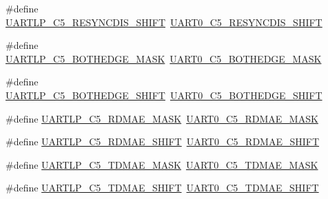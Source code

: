 \begin{DoxyCompactItemize}
\item 
\#define \hyperlink{group___backward___compatibility___symbols_gaff26147c2d7f8a45ddaa3d4ecb42343d}{U\+A\+R\+T\+L\+P\+\_\+\+C5\+\_\+\+R\+E\+S\+Y\+N\+C\+D\+I\+S\+\_\+\+S\+H\+I\+FT}~\hyperlink{group___u_a_r_t0___register___masks_gaf769ed12082fb9c441d47f5cdf1117e0}{U\+A\+R\+T0\+\_\+\+C5\+\_\+\+R\+E\+S\+Y\+N\+C\+D\+I\+S\+\_\+\+S\+H\+I\+FT}
\item 
\#define \hyperlink{group___backward___compatibility___symbols_ga6b248448b3fc7bf345c7a75bec3b8aa3}{U\+A\+R\+T\+L\+P\+\_\+\+C5\+\_\+\+B\+O\+T\+H\+E\+D\+G\+E\+\_\+\+M\+A\+SK}~\hyperlink{group___u_a_r_t0___register___masks_gaa34159b3052095ce96fa50cc6183de77}{U\+A\+R\+T0\+\_\+\+C5\+\_\+\+B\+O\+T\+H\+E\+D\+G\+E\+\_\+\+M\+A\+SK}
\item 
\#define \hyperlink{group___backward___compatibility___symbols_gac6b4dfae8e6dc532807323db5e2e489c}{U\+A\+R\+T\+L\+P\+\_\+\+C5\+\_\+\+B\+O\+T\+H\+E\+D\+G\+E\+\_\+\+S\+H\+I\+FT}~\hyperlink{group___u_a_r_t0___register___masks_ga7d1df71b9671df4f50ecb6c1e1518731}{U\+A\+R\+T0\+\_\+\+C5\+\_\+\+B\+O\+T\+H\+E\+D\+G\+E\+\_\+\+S\+H\+I\+FT}
\item 
\#define \hyperlink{group___backward___compatibility___symbols_ga8b81dfd26f766f55a3c80110e5439652}{U\+A\+R\+T\+L\+P\+\_\+\+C5\+\_\+\+R\+D\+M\+A\+E\+\_\+\+M\+A\+SK}~\hyperlink{group___u_a_r_t0___register___masks_ga75704957ea817d0ea4ef69975008dae1}{U\+A\+R\+T0\+\_\+\+C5\+\_\+\+R\+D\+M\+A\+E\+\_\+\+M\+A\+SK}
\item 
\#define \hyperlink{group___backward___compatibility___symbols_gabf5bb3ff2b944bfdbfd8b05f29c7b678}{U\+A\+R\+T\+L\+P\+\_\+\+C5\+\_\+\+R\+D\+M\+A\+E\+\_\+\+S\+H\+I\+FT}~\hyperlink{group___u_a_r_t0___register___masks_ga5074684d000e97fb534e7e1dc22ea172}{U\+A\+R\+T0\+\_\+\+C5\+\_\+\+R\+D\+M\+A\+E\+\_\+\+S\+H\+I\+FT}
\item 
\#define \hyperlink{group___backward___compatibility___symbols_ga7846766b042194a47ed511aa4114210e}{U\+A\+R\+T\+L\+P\+\_\+\+C5\+\_\+\+T\+D\+M\+A\+E\+\_\+\+M\+A\+SK}~\hyperlink{group___u_a_r_t0___register___masks_ga02899afc667f46e4beecd75e31b0fa90}{U\+A\+R\+T0\+\_\+\+C5\+\_\+\+T\+D\+M\+A\+E\+\_\+\+M\+A\+SK}
\item 
\#define \hyperlink{group___backward___compatibility___symbols_gac2909b753be3968e0878180017501e56}{U\+A\+R\+T\+L\+P\+\_\+\+C5\+\_\+\+T\+D\+M\+A\+E\+\_\+\+S\+H\+I\+FT}~\hyperlink{group___u_a_r_t0___register___masks_ga932dfb6ee4de4ff77a7a7d3154718286}{U\+A\+R\+T0\+\_\+\+C5\+\_\+\+T\+D\+M\+A\+E\+\_\+\+S\+H\+I\+FT}
\item 

\end{DoxyCompactItemize}
